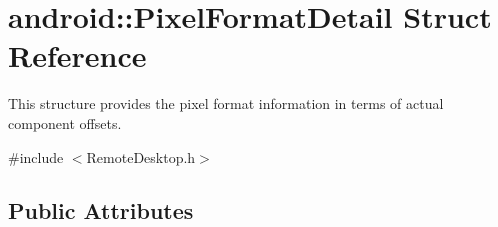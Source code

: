 \hypertarget{structandroid_1_1PixelFormatDetail}{\section{android\-:\-:\-Pixel\-Format\-Detail \-Struct \-Reference}
\label{structandroid_1_1PixelFormatDetail}
}


\-This structure provides the pixel format information in terms of actual component offsets.  




{\ttfamily \#include $<$\-Remote\-Desktop.\-h$>$}

\subsection*{\-Public \-Attributes}
